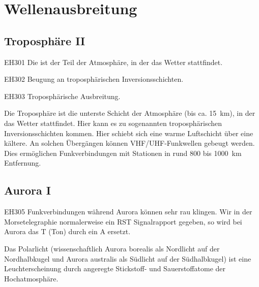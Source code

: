 \setcounter{section}{1}
\section{Wellenausbreitung}

\subsection{Troposphäre II}

\begin{sol}{EH301}
 Die  ist der Teil der Atmosphäre, in der das Wetter stattfindet.
\end{sol}

\begin{sol}{EH302}
 Beugung an troposphärischen Inversionsschichten.
\end{sol}

\begin{sol}{EH303}
 Troposphärische Ausbreitung.
\end{sol}

\begin{ohmchapter}
    Die Troposphäre ist die unterste Schicht der Atmosphäre (bis ca. \SI{15}{\kilo\meter}), in der das Wetter stattfindet.
    Hier kann es zu sogenannten troposphärischen Inversionsschichten kommen. Hier schiebt sich eine warme Luftschicht über eine kältere. An solchen Übergängen können VHF/UHF-Funkwellen gebeugt werden. Dies ermöglichen Funkverbindungen mit Stationen in rund 800 bis \SI{1000}{\kilo\meter} Entfernung.
\end{ohmchapter}  

\subsection{Aurora I}

\begin{sol}{EH305}
Funkverbindungen während Aurora können sehr rau klingen.
Wir in der Morsetelegraphie normalerweise ein RST Signalrapport gegeben, so wird bei Aurora das T (Ton) durch ein A ersetzt.
\end{sol}

\begin{ohmchapter}
Das Polarlicht (wissenschaftlich Aurora borealis als Nordlicht auf der Nordhalbkugel und Aurora australis als Südlicht auf der Südhalbkugel) ist eine Leuchterscheinung durch angeregte Stickstoff- und Sauerstoffatome der Hochatmosphäre.    
\end{ohmchapter}  

